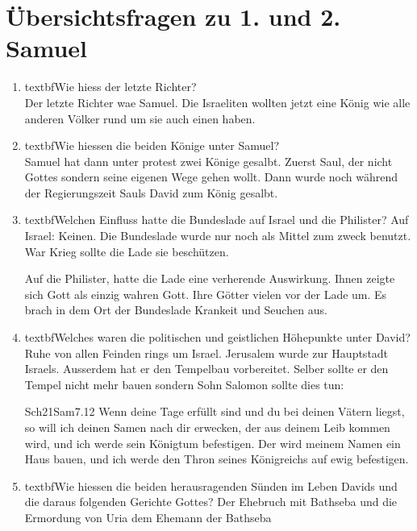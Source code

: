 \section{Übersichtsfragen zu 1. und 2. Samuel}
\begin{enumerate}
    \item textbf{Wie hiess der letzte Richter?}\\
    Der letzte Richter wae Samuel. Die Israeliten wollten jetzt eine König wie alle anderen Völker rund um sie auch einen haben.
    \item textbf{Wie hiessen die beiden Könige unter Samuel?}\\
    Samuel hat dann unter protest zwei Könige gesalbt. Zuerst Saul, der nicht Gottes sondern seine eigenen Wege gehen wollt. Dann wurde noch während der Regierungszeit Sauls David zum König gesalbt.
    \item textbf{Welchen Einfluss hatte die Bundeslade auf Israel und die Philister?}
    Auf Israel: Keinen. Die Bundeslade wurde nur noch als Mittel zum zweck benutzt. War Krieg sollte die Lade sie beschützen.

    Auf die Philister, hatte die Lade eine verherende Auswirkung. Ihnen zeigte sich Gott als einzig wahren Gott. Ihre Götter vielen vor der Lade um. Es brach in dem Ort der Bundeslade Krankeit und Seuchen aus.
    \item textbf{Welches waren die politischen und geistlichen Höhepunkte unter David?}
    Ruhe von allen Feinden rings um Israel. Jerusalem wurde zur Hauptstadt Israels. Ausserdem hat er den Tempelbau vorbereitet. Selber sollte er den Tempel nicht mehr bauen sondern Sohn Salomon sollte dies tun:
    \begin{bibeltext}{Sch2}{1Sam}{7.12}
        Wenn deine Tage erfüllt sind und du bei deinen Vätern liegst, so will ich deinen Samen nach dir erwecken, der aus deinem Leib kommen wird, und ich werde sein Königtum befestigen. Der wird meinem Namen ein Haus bauen, und ich werde den Thron seines Königreichs auf ewig befestigen.
    \end{bibeltext}
    \item textbf{Wie hiessen die beiden herausragenden     Sünden im Leben Davids und die daraus folgenden Gerichte Gottes?}
    Der Ehebruch mit Bathseba und die Ermordung von Uria dem Ehemann der Bathseba
\end{enumerate}